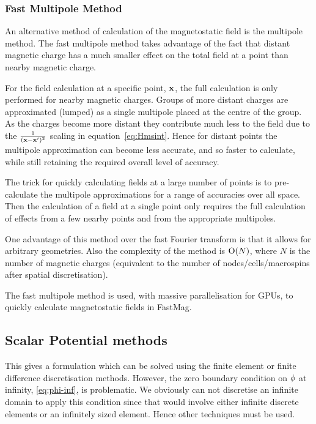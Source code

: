 \subsubsection{Fast Multipole Method}
\label{sec:fast-mult-meth}

An alternative method of calculation of the magnetostatic field is the multipole method.
The fast multipole method takes advantage of the fact that distant magnetic charge has a much smaller effect on the total field at a point than nearby magnetic charge.

For the field calculation at a specific point, $\mathbf{x}$, the full calculation is only performed for nearby magnetic charges.
Groups of more distant charges are approximated (lumped) as a single multipole placed at the centre of the group.
As the charges become more distant they contribute much less to the field due to the $\frac{1}{(\mathbf{x} - \mathbf{x}')^2}$ scaling in equation~\eqref{eq:Hmsint}.
Hence for distant points the multipole approximation can become less accurate, and so faster to calculate, while still retaining the required overall level of accuracy.

The trick for quickly calculating fields at a large number of points is to pre-calculate the multipole approximations for a range of accuracies over all space.
Then the calculation of a field at a single point only requires the full calculation of effects from a few nearby points and from the appropriate multipoles.\cite{Beatson}

One advantage of this method over the fast Fourier transform is that it allows for arbitrary geometries.
Also the complexity of the method is $\text{O}(N)$, where $N$ is the number of magnetic charges (equivalent to the number of nodes/cells/macrospins after spatial discretisation).\cite{Chang2011}

The fast multipole method is used, with massive parallelisation for GPUs, to quickly calculate magnetostatic fields in FastMag.\cite{Chang2011} %


\subsection{Scalar Potential methods}
\label{sec:magstat-field-calc-pote}

This gives a formulation which can be solved using the finite element or finite difference discretisation methods.
However, the zero boundary condition on $\phi$ at infinity, \eqref{eq:phi-inf}, is problematic.
We obviously can not discretise an infinite domain to apply this condition since that would involve either infinite discrete elements or an infinitely sized element.
Hence other techniques must be used.

